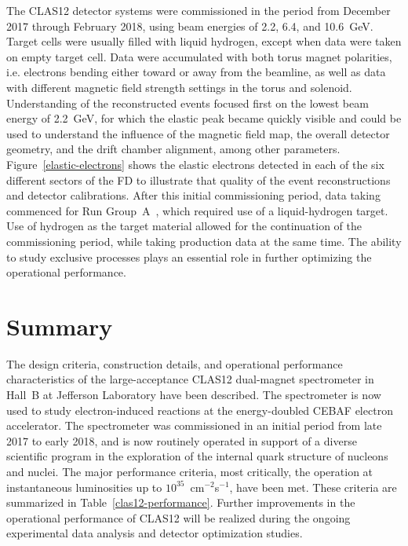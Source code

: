 \documentclass[final,3p,twocolumn]{elsarticle}
\begin{document}
The CLAS12 detector systems were commissioned in the period from December 2017 through February 2018, using
beam energies of 2.2, 6.4, and 10.6~GeV. Target cells were usually filled with liquid hydrogen, except when data were taken on
empty target cell. Data were accumulated with both torus magnet polarities, i.e. electrons
bending either toward or away from the beamline, as well as data with different magnetic field strength settings
in the torus and solenoid. Understanding of the reconstructed events focused first on the lowest beam energy of
2.2~GeV, for which the elastic peak became quickly visible and could be used to understand the influence of the
magnetic field map, the overall detector geometry, and the drift chamber alignment, among other parameters.
Figure~\ref{elastic-electrons} shows the elastic electrons detected in each of the six different sectors of the FD
to illustrate that quality of the event reconstructions and detector calibrations. After this initial commissioning
period, data taking commenced for Run Group~A~\cite{rg-details}, which required use of a liquid-hydrogen target.
Use of hydrogen as the target material allowed for the continuation of the commissioning period, while taking
production data at the same time. The ability to study exclusive processes plays an essential role in further optimizing
the operational performance. 

\section{Summary} 

The design criteria, construction details, and operational performance characteristics of the large-acceptance
CLAS12 dual-magnet spectrometer in Hall~B at Jefferson Laboratory have been described. The spectrometer is
now used to study electron-induced reactions at the energy-doubled CEBAF electron accelerator. The spectrometer
was commissioned in an initial period from late 2017 to early 2018, and is now routinely operated in support of
a diverse scientific program in the exploration of the internal quark structure of nucleons and nuclei. The major
performance criteria, most critically, the operation at  instantaneous luminosities up to $10^{35}$~cm$^{-2}$s$^{-1}$,
have been met. These criteria are summarized in Table~\ref{clas12-performance}. Further improvements in the
operational performance of CLAS12 will be realized during the ongoing experimental data analysis and detector
optimization studies.
\end{document}
